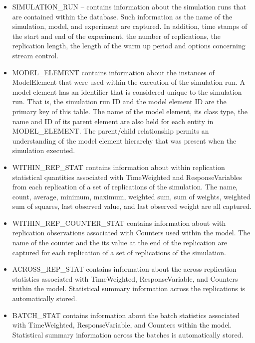 \documentclass[
]{book}
\providecommand{\tightlist}{%
  \setlength{\itemsep}{0pt}\setlength{\parskip}{0pt}}
\theoremstyle{definition}
\theoremstyle{definition}
\theoremstyle{definition}
\theoremstyle{definition}
\theoremstyle{remark}
\begin{document}
\begin{itemize}
\tightlist
\item
  SIMULATION\_RUN -- contains information about the simulation runs
  that are contained within the database. Such information as the name
  of the simulation, model, and experiment are captured. In addition,
  time stamps of the start and end of the experiment, the number of
  replications, the replication length, the length of the warm up
  period and options concerning stream control.
\item
  MODEL\_ELEMENT contains information about the instances of
  ModelElement that were used within the execution of the simulation
  run. A model element has an identifier that is considered unique to
  the simulation run. That is, the simulation run ID and the model
  element ID are the primary key of this table. The name of the model
  element, its class type, the name and ID of its parent element are
  also held for each entity in MODEL\_ELEMENT. The parent/child
  relationship permits an understanding of the model element hierarchy
  that was present when the simulation executed.
\item
  WITHIN\_REP\_STAT contains information about within replication
  statistical quantities associated with TimeWeighted and
  ResponseVariables from each replication of a set of replications of
  the simulation. The name, count, average, minimum, maximum, weighted
  sum, sum of weights, weighted sum of squares, last observed value,
  and last observed weight are all captured.
\item
  WITHIN\_REP\_COUNTER\_STAT contains information about with
  replication observations associated with Counters used within the
  model. The name of the counter and the its value at the end of the
  replication are captured for each replication of a set of
  replications of the simulation.
\item
  ACROSS\_REP\_STAT contains information about the across replication
  statistics associated with TimeWeighted, ResponseVariable, and
  Counters within the model. Statistical summary information across
  the replications is automatically stored.
\item
  BATCH\_STAT contains information about the batch statistics
  associated with TimeWeighted, ResponseVariable, and Counters within
  the model. Statistical summary information across the batches is
  automatically stored.
\end{itemize}
\end{document}
